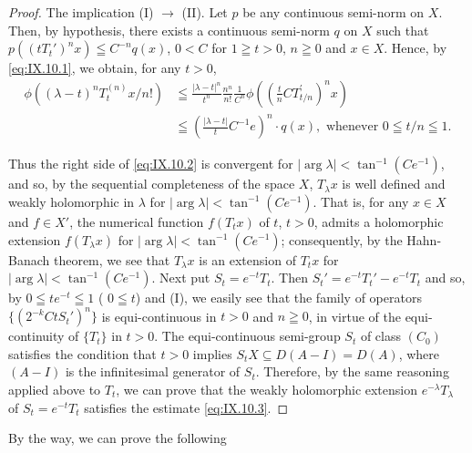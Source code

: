 \begin{proof}
 The implication (I) $\rightarrow$ (II). Let $p$ be any continuous semi-norm on $X$. Then, by hypothesis, there exists a continuous semi-norm $q$ on $X$ such that $p((tT_t')^n x) \leqq C^{-n} q(x)$, $0 < C$ for $1 \geqq t > 0$, $n \geqq 0$ and $x \in X$. Hence, by \eqref{eq:IX.10.1}, we obtain, for any $t > 0$, 
\[ \begin{aligned} \phi ((\lambda - t) ^{n} T _{t} ^{(n)} x / n!) & \leqq \frac {| \lambda - t | ^{n}}{t ^{n}} \frac {n ^{n}}{n !} \frac {1}{C ^{n}} \phi \left(\left(\frac {t}{n} C T _{t/n} ^{\prime}\right) ^{n} x\right) \\ & \leqq \left(\frac {| \lambda - t |}{t} C ^{-1} e\right) ^{n} \cdot q (x), \text{ whenever } 0 \leqq t / n \leqq 1. \end{aligned}
\]

Thus the right side of \eqref{eq:IX.10.2} is convergent for $|\arg \lambda| < \tan^{-1}(Ce^{-1})$, and so, by the sequential completeness of the space $X$, $T_{\lambda}x$ is well defined and weakly holomorphic in $\lambda$ for $|\arg \lambda| < \tan^{-1}(Ce^{-1})$. That is, for any $x \in X$ and $f \in X'$, the numerical function $f(T_t x)$ of $t$, $t > 0$, admits a holomorphic extension $f(T_{\lambda}x)$ for $|\arg \lambda| < \tan^{-1}(Ce^{-1})$; consequently, by the Hahn-Banach theorem, we see that $T_{\lambda}x$ is an extension of $T_t x$ for $|\arg \lambda| < \tan^{-1}(Ce^{-1})$. Next put $S_t = e^{-t} T_t$. Then $S_t' = e^{-t} T_t' - e^{-t} T_t$ and so, by $0 \leqq te^{-t} \leqq 1$ ( $0 \leqq t$) and (I), we easily see that the family of operators $\{(2^{-k} Ct S_t')^n\}$ is equi-continuous in $t > 0$ and $n \geqq 0$, in virtue of the equi-continuity of $\{T_t\}$ in $t > 0$. The equi-continuous semi-group $S_t$ of class $(C_0)$ satisfies the condition that $t > 0$ implies $S_t X \subseteq D(A - I) = D(A)$, where $(A - I)$ is the infinitesimal generator of $S_t$. Therefore, by the same reasoning applied above to $T_t$, we can prove that the weakly holomorphic extension $e^{-\lambda} T_{\lambda}$ of $S_t = e^{-t} T_t$ satisfies the estimate \eqref{eq:IX.10.3}. 
\end{proof}

By the way, we can prove the following 

